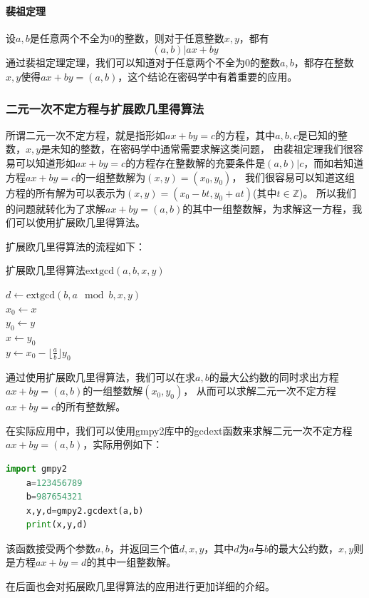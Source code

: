 \documentclass{article}
\numberwithin{equation}{subsubsection}
\begin{document}
\paragraph{\textbf{裴祖定理}}
设$a,b$是任意两个不全为$0$的整数，则对于任意整数$x,y$，都有
\begin{equation}
    (a,b)|ax+by
    \nonumber
\end{equation}
通过裴祖定理定理，我们可以知道对于任意两个不全为$0$的整数$a,b$，都存在整数$x,y$使得$ax+by=(a,b)$，这个结论在密码学中有着重要的应用。\par

\subsubsection{二元一次不定方程与扩展欧几里得算法}
所谓二元一次不定方程，就是指形如$ax+by=c$的方程，其中$a,b,c$是已知的整数，$x,y$是未知的整数，在密码学中通常需要求解这类问题，
由裴祖定理我们很容易可以知道形如$ax+by=c$的方程存在整数解的充要条件是$(a,b)|c$，而如若知道方程$ax+by=c$的一组整数解为$(x,y)=(x_0,y_0)$，
我们很容易可以知道这组方程的所有解为可以表示为$(x,y)=(x_0-bt,y_0+at)$(其中$t\in \mathbb{Z}$)。
所以我们的问题就转化为了求解$ax+by=(a,b)$的其中一组整数解，为求解这一方程，我们可以使用扩展欧几里得算法。\par
扩展欧几里得算法的流程如下：
\begin{algorithm}
    \caption{扩展欧几里得算法$\text{extgcd}(a,b,x,y)$}
    $d\leftarrow \text{extgcd}(b,a\mod b,x,y)$\\
    $x_0\leftarrow x$\\
    $y_0\leftarrow y$\\
    $x\leftarrow y_0$\\
    $y\leftarrow x_0-\lfloor \frac{a}{b}\rfloor y_0$\\
\end{algorithm}\par
通过使用扩展欧几里得算法，我们可以在求$a,b$的最大公约数的同时求出方程$ax+by=(a,b)$的一组整数解$(x_0,y_0)$，
从而可以求解二元一次不定方程$ax+by=c$的所有整数解。\par
在实际应用中，我们可以使用gmpy2库中的gcdext函数来求解二元一次不定方程$ax+by=(a,b)$，实际用例如下：
\begin{lstlisting}[language=Python,basicstyle=\ttfamily,breaklines=true,keywordstyle=\bfseries\color{blue}]
    import gmpy2
    a=123456789
    b=987654321
    x,y,d=gmpy2.gcdext(a,b)
    print(x,y,d)
\end{lstlisting}
该函数接受两个参数$a,b$，并返回三个值$d,x,y$，其中$d$为$a$与$b$的最大公约数，$x,y$则是方程$ax+by=d$的其中一组整数解。\par
在后面也会对拓展欧几里得算法的应用进行更加详细的介绍。\par
\end{document}

